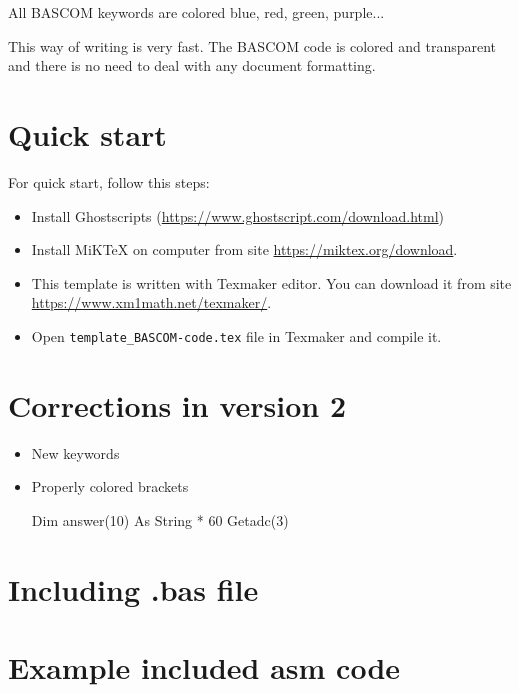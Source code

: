 \documentclass[10pt,a4paper]{article}
\begin{document}
All BASCOM keywords are colored blue, red, green, purple...

This way of writing is very fast. The BASCOM code is colored and transparent and there is no need to deal with any document formatting.

\section{Quick start}
For quick start, follow this steps:
\begin{itemize}
\setlength{\itemsep}{0pt}%
\setlength{\parskip}{0pt}%
\item Install Ghostscripts (\href{https://www.ghostscript.com/download.html} {https://www.ghostscript.com/download.html})
\item Install MiKTeX on computer from site \href{https://miktex.org/download}{https://miktex.org/download}. 
\item This template is written with Texmaker editor. You can download it from site\\ \href{https://www.xm1math.net/texmaker/}{https://www.xm1math.net/texmaker/}.
\item Open \texttt{template\_BASCOM-code.tex} file in Texmaker and compile it.
\end{itemize}

\section{Corrections in version 2}
\begin{itemize}
\setlength{\itemsep}{0pt}%
\setlength{\parskip}{0pt}%
\item New keywords
\item Properly colored brackets
\begin{Bascomlisting}
Dim answer(10) As String * 60
Getadc(3) 
\end{Bascomlisting}
\end{itemize}

\newpage
\section{Including .bas file}


\newpage
\section{Example included asm code}

\newpage
\end{document}
